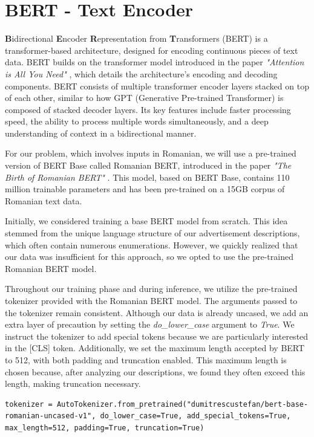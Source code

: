 \section{BERT - Text Encoder}
\label{sec:bert}
\textbf{B}idirectional \textbf{E}ncoder \textbf{R}epresentation from \textbf{T}ransformers (BERT) \cite{bert} is a transformer-based architecture, designed for encoding continuous pieces of text data. BERT builds on the transformer model introduced in the paper \textit{"Attention is All You Need"} \cite{attention}, which details the architecture's encoding and decoding components. BERT consists of multiple transformer encoder layers stacked on top of each other, similar to how GPT (Generative Pre-trained Transformer) is composed of stacked decoder layers. Its key features include faster processing speed, the ability to process multiple words simultaneously, and a deep understanding of context in a bidirectional manner.

For our problem, which involves inputs in Romanian, we will use a pre-trained version of BERT Base called Romanian BERT, introduced in the paper \textit{"The Birth of Romanian BERT"} \cite{dumitrescu-etal-2020-birth}. This model, based on BERT Base, contains 110 million trainable parameters and has been pre-trained on a 15GB corpus of Romanian text data.

Initially, we considered training a base BERT model from scratch. This idea stemmed from the unique language structure of our advertisement descriptions, which often contain numerous enumerations. However, we quickly realized that our data was insufficient for this approach, so we opted to use the pre-trained Romanian BERT model.

Throughout our training phase and during inference, we utilize the pre-trained tokenizer provided with the Romanian BERT model. The arguments passed to the tokenizer remain consistent. Although our data is already uncased, we add an extra layer of precaution by setting the \textit{do\_lower\_case} argument to \textit{True}. We instruct the tokenizer to add special tokens because we are particularly interested in the [CLS] token. Additionally, we set the maximum length accepted by BERT to 512, with both padding and truncation enabled. This maximum length is chosen because, after analyzing our descriptions, we found they often exceed this length, making truncation necessary.

\begin{lstlisting}
tokenizer = AutoTokenizer.from_pretrained("dumitrescustefan/bert-base-romanian-uncased-v1", do_lower_case=True, add_special_tokens=True, max_length=512, padding=True, truncation=True)
\end{lstlisting}

